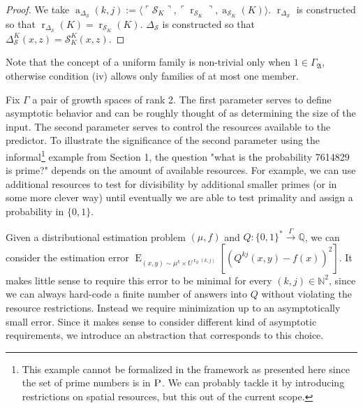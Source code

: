 \documentclass{article}
\theoremstyle{definition}
\theoremstyle{plain}
\newcommand{\Words}{{\{ 0, 1 \}^*}}
\DeclareMathOperator{\E}{E}
\DeclareMathOperator{\R}{r}
\DeclareMathOperator{\A}{a}
\newcommand{\Nats}{\mathbb{N}}
\newcommand{\Rats}{\mathbb{Q}}
\newcommand{\Chev}[1]{\langle #1 \rangle}
\newcommand{\Quote}[1]{\ulcorner #1 \urcorner}
\begin{document}
\begin{proof}

We take $\A_{\Delta_{\mathcal{S}}}(k,j):=\Chev{\Quote{\mathcal{S}_K},\Quote{\R_{\mathcal{S}_K}},\A_{\mathcal{S}_K}(K)}$. $\R_{\Delta_{\mathcal{S}}}$ is constructed so that $\R_{\Delta_{\mathcal{S}}}(K)=\R_{\mathcal{S}_K}(K)$. $\Delta_{\mathcal{S}}$ is constructed so that $\Delta_{\mathcal{S}}^K(x,z)=\mathcal{S}_K^K(x,z)$.

\end{proof}

Note that the concept of a uniform family is non-trivial only when $1 \in \Gamma_{\mathfrak{A}}$, otherwise condition (iv) allows only families of at most one member.

Fix $\Gamma$ a pair of growth spaces of rank 2. The first parameter serves to define asymptotic behavior and can be roughly thought of as determining the size of the input. The second parameter serves to control the resources available to the predictor. To illustrate the significance of the second parameter using the informal\footnote{This example cannot be formalized in the framework as presented here since the set of prime numbers is in $\textsc{P}$. We can probably tackle it by introducing restrictions on spatial resources, but this out of the current scope.} example from Section 1, the question "what is the probability 7614829 is prime?" depends on the amount of available resources. For example, we can use additional resources to test for divisibility by additional smaller primes (or in some more clever way) until eventually we are able to test primality and assign a probability in $\{0,1\}$.

Given a distributional estimation problem $(\mu,f)$ and $Q: \Words \xrightarrow{\Gamma} \Rats$, we can consider the estimation error $\E_{(x,y) \sim \mu^k \times U^{\R_Q(k,j)}}[(Q^{kj}(x,y) - f(x))^2]$. It makes little sense to require this error to be minimal for every $(k,j) \in \Nats^2$, since we can always hard-code a finite number of answers into $Q$ without violating the resource restrictions. Instead we require minimization up to an asymptotically small error. Since it makes sense to consider different kind of asymptotic requirements, we introduce an abstraction that corresponds to this choice.
\end{document}
